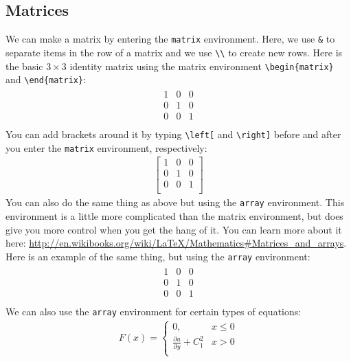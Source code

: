 \documentclass[]{article}%
\newcommand{\bs}{\textbackslash}
\newcommand{\TT}[1]{\texttt{#1}}
\theoremstyle{definition}
\begin{document}
	\subsection{Matrices}
	\label{sec:matrices}
	We can make a matrix by entering the \TT{matrix} environment.
	Here, we use \TT{\&} to separate items in the row of a matrix and we use \TT{\bs\bs} to create new rows.
	Here is the basic $3 \times 3$ identity matrix using the matrix environment \TT{\bs begin\{matrix\}} and \TT{\bs end\{matrix\}}:
	\begin{align*}
		\begin{matrix}
			1 & 0 & 0 \\
			0 & 1 & 0 \\
			0 & 0 & 1 \\
		\end{matrix}
	\end{align*}
	You can add brackets around it by typing \TT{\bs left[} and \TT{\bs right]} before and after you enter the \TT{matrix} environment, respectively:
	\begin{align*}
		\left[
		\begin{matrix}
			1 & 0 & 0 \\
			0 & 1 & 0 \\
			0 & 0 & 1 \\
		\end{matrix}
		\right]
	\end{align*}
	You can also do the same thing as above but using the \TT{array} environment.
	This environment is a little more complicated than the matrix environment, but does give you more control when you get the hang of it.
	You can learn more about it here: \url{http://en.wikibooks.org/wiki/LaTeX/Mathematics#Matrices_and_arrays}.
	Here is an example of the same thing, but using the \TT{array} environment:
	\begin{align*}
		\begin{array}{ccc}
			1 & 0 & 0 \\
			0 & 1 & 0 \\
			0 & 0 & 1 \\
		\end{array}
	\end{align*}
	We can also use the \TT{array} environment for certain types of equations:
	\begin{align}
		F(x) = \left\{ 
		\begin{array}{ll}
			0, & x \leq 0 \\
			\frac{\partial u}{\partial y} + C_1^2  & x > 0\\
		\end{array}
		\right. 
	\end{align}
\end{document}
